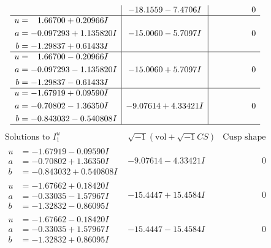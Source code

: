 \documentclass[1p]{elsarticle_modified}
\theoremstyle{definition}
\newcommand{\I}{\sqrt{-1}}
\begin{document}
$$\begin{array}{c|c|c}
 & -18.1559 - 7.4706 I & \phantom{-0.000000 } 0 \\ \hline\begin{aligned}
u &= \phantom{-}1.66700 + 0.20966 I \\
a &= -0.097293 + 1.135820 I \\
b &= -1.29837 + 0.61433 I\end{aligned}
 & -15.0060 - 5.7097 I & \phantom{-0.000000 } 0 \\ \hline\begin{aligned}
u &= \phantom{-}1.66700 - 0.20966 I \\
a &= -0.097293 - 1.135820 I \\
b &= -1.29837 - 0.61433 I\end{aligned}
 & -15.0060 + 5.7097 I & \phantom{-0.000000 } 0 \\ \hline\begin{aligned}
u &= -1.67919 + 0.09590 I \\
a &= -0.70802 - 1.36350 I \\
b &= -0.843032 - 0.540808 I\end{aligned}
 & -9.07614 + 4.33421 I & \phantom{-0.000000 } 0\\
 \hline 
 \end{array}$$\newpage$$\begin{array}{c|c|c}  
\text{Solutions to }I^u_{1}& \I (\text{vol} + \sqrt{-1}CS) & \text{Cusp shape}\\
 \hline 
\begin{aligned}
u &= -1.67919 - 0.09590 I \\
a &= -0.70802 + 1.36350 I \\
b &= -0.843032 + 0.540808 I\end{aligned}
 & -9.07614 - 4.33421 I & \phantom{-0.000000 } 0 \\ \hline\begin{aligned}
u &= -1.67662 + 0.18420 I \\
a &= -0.33035 - 1.57967 I \\
b &= -1.32832 - 0.86095 I\end{aligned}
 & -15.4447 + 15.4584 I & \phantom{-0.000000 } 0 \\ \hline\begin{aligned}
u &= -1.67662 - 0.18420 I \\
a &= -0.33035 + 1.57967 I \\
b &= -1.32832 + 0.86095 I\end{aligned}
 & -15.4447 - 15.4584 I & \phantom{-0.000000 } 0 \\ \hline\begin{aligned}

\end{aligned}
\end{array}$$
\end{document}
